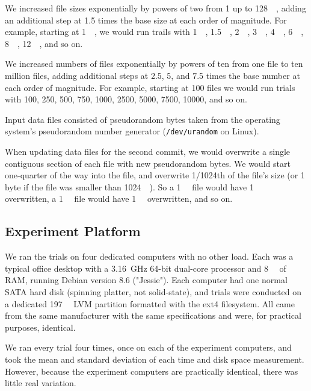We increased file sizes exponentially by powers of two from \SI{1}{\byte} up to \SI{128}{\gibi\byte}, adding an additional step at \num{1.5} times the base size at each order of magnitude.
For example, starting at \SI{1}{\mebi\byte}, we would run trails with \SI{1}{\mebi\byte}, \SI{1.5}{\mebi\byte}, \SI{2}{\mebi\byte}, \SI{3}{\mebi\byte}, \SI{4}{\mebi\byte}, \SI{6}{\mebi\byte}, \SI{8}{\mebi\byte}, \SI{12}{\mebi\byte}, and so on.

We increased numbers of files exponentially by powers of ten from one file to ten million files, adding additional steps at \num{2.5}, \num{5}, and \num{7.5} times the base number at each order of magnitude.
For example, starting at \num{100} files we would run trials with \num{100}, \num{250}, \num{500}, \num{750}, \num{1000}, \num{2500}, \num{5000}, \num{7500}, \num{10000}, and so on.

Input data files consisted of pseudorandom bytes taken from the operating system's pseudorandom number generator (\lstinline{/dev/urandom} on Linux).

When updating data files for the second \gls{commit}, we would overwrite a single contiguous section of each file with new pseudorandom bytes.
We would start one-quarter of the way into the file, and overwrite \num{1/1024}th of the file's size (or 1 byte if the file was smaller than \SI{1024}{\kibi\byte}).
So a \SI{1}{\mebi\byte} file would have \SI{1}{\kibi\byte} overwritten, a \SI{1}{\gibi\byte} file would have \SI{1}{\mebi\byte} overwritten, and so on.

%

\subsection{Experiment Platform}

We ran the trials on four dedicated computers with no other load.
Each was a typical office desktop with a \SI{3.16}{\giga\hertz} \num{64}-bit dual-core processor and \SI{8}{\gibi\byte} of RAM, running Debian version 8.6 ("Jessie").
Each computer had one normal SATA hard disk (spinning platter, not solid-state), and trials were conducted on a dedicated \SI{197}{\gibi\byte} LVM partition formatted with the ext4 filesystem.
All came from the same manufacturer with the same specifications and were, for practical purposes, identical.

We ran every trial four times, once on each of the experiment computers, and took the mean and standard deviation of each time and disk space measurement.
However, because the experiment computers are practically identical, there was little real variation.

%
